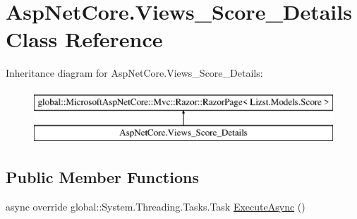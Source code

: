 \hypertarget{class_asp_net_core_1_1_views___score___details}{}\section{Asp\+Net\+Core.\+Views\+\_\+\+Score\+\_\+\+Details Class Reference}
\label{class_asp_net_core_1_1_views___score___details}
Inheritance diagram for Asp\+Net\+Core.\+Views\+\_\+\+Score\+\_\+\+Details\+:\begin{figure}[H]
\begin{center}
\leavevmode
\includegraphics[height=2.000000cm]{class_asp_net_core_1_1_views___score___details}
\end{center}
\end{figure}
\subsection*{Public Member Functions}
\begin{DoxyCompactItemize}
\item 
async override global\+::\+System.\+Threading.\+Tasks.\+Task \mbox{\hyperlink{class_asp_net_core_1_1_views___score___details_a0f6adc6239de8eb6d356c4407a739c27}{Execute\+Async}} ()
\end{DoxyCompactItemize}
